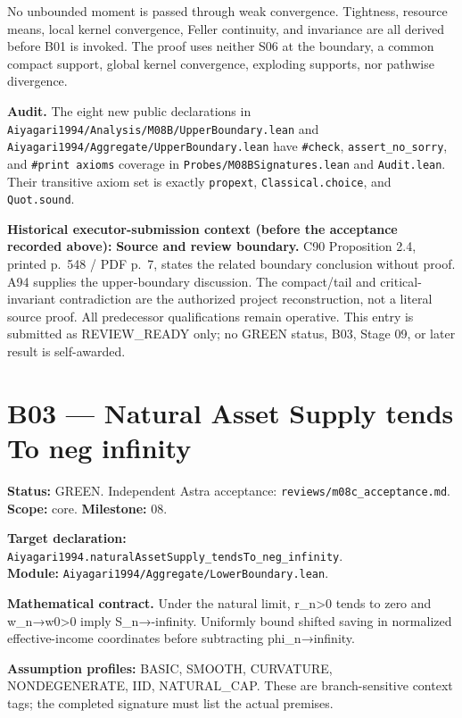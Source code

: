 \documentclass[
  11pt,
]{article}
\let\LedgerOriginalTexttt\texttt
\renewcommand{\texttt}[1]{{\small\LedgerOriginalTexttt{#1}}}
\begin{document}
No unbounded moment is passed through weak convergence. Tightness,
resource means, local kernel convergence, Feller continuity, and
invariance are all derived before B01 is invoked. The proof uses neither
S06 at the boundary, a common compact support, global kernel
convergence, exploding supports, nor pathwise divergence.

\textbf{Audit.} The eight new public declarations in
\texttt{Aiyagari1994/Analysis/M08B/UpperBoundary.lean} and
\texttt{Aiyagari1994/Aggregate/UpperBoundary.lean} have
\texttt{\#check}, \texttt{assert\_no\_sorry}, and
\texttt{\#print\ axioms} coverage in \texttt{Probes/M08BSignatures.lean}
and \texttt{Audit.lean}. Their transitive axiom set is exactly
\texttt{propext}, \texttt{Classical.choice}, and \texttt{Quot.sound}.

\textbf{Historical executor-submission context (before the acceptance
recorded above):} \textbf{Source and review boundary.} C90 Proposition
2.4, printed p.~548 / PDF p.~7, states the related boundary conclusion
without proof. A94 supplies the upper-boundary discussion. The
compact/tail and critical-invariant contradiction are the authorized
project reconstruction, not a literal source proof. All predecessor
qualifications remain operative. This entry is submitted as
REVIEW\_READY only; no GREEN status, B03, Stage 09, or later result is
self-awarded.

\section{B03 --- Natural Asset Supply tends To neg
infinity}\label{b03-natural-asset-supply-tends-to-neg-infinity}

\textbf{Status:} GREEN. Independent Astra acceptance:
\texttt{reviews/m08c\_acceptance.md}. \textbf{Scope:} core.
\textbf{Milestone:} 08.

\textbf{Target declaration:}
\texttt{Aiyagari1994.naturalAssetSupply\_tendsTo\_neg\_infinity}.\\
\textbf{Module:} \texttt{Aiyagari1994/Aggregate/LowerBoundary.lean}.

\textbf{Mathematical contract.} Under the natural limit,
r\_n\textgreater0 tends to zero and w\_n→w0\textgreater0 imply
S\_n→-infinity. Uniformly bound shifted saving in normalized
effective-income coordinates before subtracting phi\_n→infinity.

\textbf{Assumption profiles:} BASIC, SMOOTH, CURVATURE, NONDEGENERATE,
IID, NATURAL\_CAP. These are branch-sensitive context tags; the
completed signature must list the actual premises.
\end{document}
